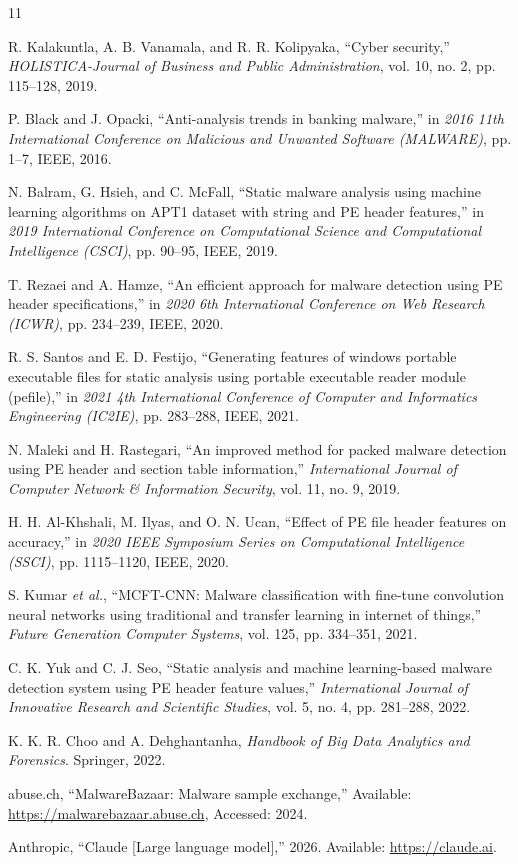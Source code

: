 \documentclass[conference,a4paper]{IEEEtran}
\begin{document}
\begin{thebibliography}{11}

R. Kalakuntla, A. B. Vanamala, and R. R. Kolipyaka, ``Cyber security,'' \textit{HOLISTICA-Journal of Business and Public Administration}, vol. 10, no. 2, pp. 115--128, 2019.

P. Black and J. Opacki, ``Anti-analysis trends in banking malware,'' in \textit{2016 11th International Conference on Malicious and Unwanted Software (MALWARE)}, pp. 1--7, IEEE, 2016.

N. Balram, G. Hsieh, and C. McFall, ``Static malware analysis using machine learning algorithms on APT1 dataset with string and PE header features,'' in \textit{2019 International Conference on Computational Science and Computational Intelligence (CSCI)}, pp. 90--95, IEEE, 2019.

T. Rezaei and A. Hamze, ``An efficient approach for malware detection using PE header specifications,'' in \textit{2020 6th International Conference on Web Research (ICWR)}, pp. 234--239, IEEE, 2020.

R. S. Santos and E. D. Festijo, ``Generating features of windows portable executable files for static analysis using portable executable reader module (pefile),'' in \textit{2021 4th International Conference of Computer and Informatics Engineering (IC2IE)}, pp. 283--288, IEEE, 2021.

N. Maleki and H. Rastegari, ``An improved method for packed malware detection using PE header and section table information,'' \textit{International Journal of Computer Network \& Information Security}, vol. 11, no. 9, 2019.

H. H. Al-Khshali, M. Ilyas, and O. N. Ucan, ``Effect of PE file header features on accuracy,'' in \textit{2020 IEEE Symposium Series on Computational Intelligence (SSCI)}, pp. 1115--1120, IEEE, 2020.

S. Kumar \textit{et al.}, ``MCFT-CNN: Malware classification with fine-tune convolution neural networks using traditional and transfer learning in internet of things,'' \textit{Future Generation Computer Systems}, vol. 125, pp. 334--351, 2021.

C. K. Yuk and C. J. Seo, ``Static analysis and machine learning-based malware detection system using PE header feature values,'' \textit{International Journal of Innovative Research and Scientific Studies}, vol. 5, no. 4, pp. 281--288, 2022.

K. K. R. Choo and A. Dehghantanha, \textit{Handbook of Big Data Analytics and Forensics}. Springer, 2022.

abuse.ch, ``MalwareBazaar: Malware sample exchange,'' Available: \url{https://malwarebazaar.abuse.ch}, Accessed: 2024.

Anthropic, ``Claude [Large language model],'' 2026. Available: \url{https://claude.ai}.

\end{thebibliography}
\end{document}
